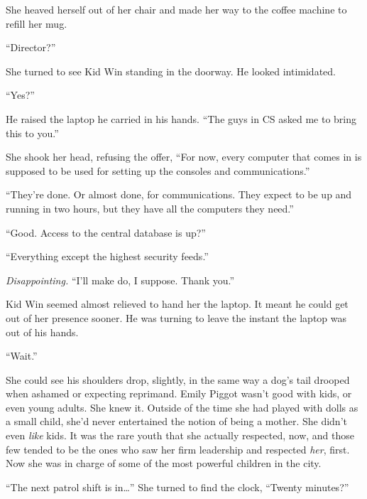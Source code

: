 She heaved herself out of her chair and made her way to the coffee machine to refill her mug.



``Director?''



She turned to see Kid Win standing in the doorway.  He looked intimidated.



``Yes?''



He raised the laptop he carried in his hands.  ``The guys in CS asked me to bring this to you.''



She shook her head, refusing the offer, ``For now, every computer that comes in is supposed to be used for setting up the consoles and communications.''



``They're done.  Or almost done, for communications.  They expect to be up and running in two hours, but they have all the computers they need.''



``Good.  Access to the central database is up?''



``Everything except the highest security feeds.''



\emph{Disappointing.  }``I'll make do, I suppose.  Thank you.''



Kid Win seemed almost relieved to hand her the laptop.  It meant he could get out of her presence sooner.  He was turning to leave the instant the laptop was out of his hands.



``Wait.''



She could see his shoulders drop, slightly, in the same way a dog's tail drooped when ashamed or expecting reprimand.  Emily Piggot wasn't good with kids, or even young adults.  She knew it.  Outside of the time she had played with dolls as a small child, she'd never entertained the notion of being a mother.  She didn't even \emph{like} kids.  It was the rare youth that she actually respected, now, and those few tended to be the ones who saw her firm leadership and respected \emph{her}, first.  Now she was in charge of some of the most powerful children in the city.



``The next patrol shift is in\ldots''  She turned to find the clock, ``Twenty minutes?''



